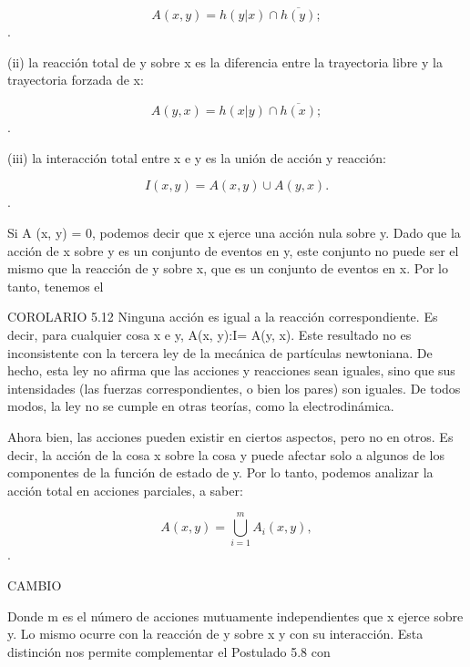 \begin{justifying}
    \begin{center}
        $$ A(x, y) = h(y|x) \cap \overline{h(y)}; $$.
    \end{center}

    (ii) la reacción total de y sobre x es la diferencia entre la trayectoria libre
    y la trayectoria forzada de x:

    \begin{center}
        $$ A(y, x) = h(x|y) \cap \overline{h(x)}; $$.
    \end{center}

    (iii) la interacción total entre x e y es la unión de acción y
    reacción:

    \begin{center}
        $$ I(x, y) = A(x, y) \cup A(y, x). $$.
    \end{center}

    Si A (x, y) = 0, podemos decir que x ejerce una acción nula sobre y.
    Dado que la acción de x sobre y es un conjunto de eventos en y, este conjunto no puede ser el
    mismo que la reacción de y sobre x, que es un conjunto de eventos en x. Por lo tanto, tenemos
    el

    COROLARIO 5.12 Ninguna acción es igual a la reacción correspondiente. Es decir, para
    cualquier cosa x e y, A(x, y):I= A(y, x).
    Este resultado no es inconsistente con la tercera ley de la mecánica de partículas newtoniana.
    De hecho, esta ley no afirma que las acciones y reacciones sean
    iguales, sino que sus intensidades (las fuerzas correspondientes, o bien
    los pares) son iguales. De todos modos, la ley no se cumple en otras teorías, como
    la electrodinámica.

    Ahora bien, las acciones pueden existir en ciertos aspectos, pero no en otros. Es decir,
    la acción de la cosa x sobre la cosa y puede afectar solo a algunos de los
    componentes de la función de estado de y. Por lo tanto, podemos analizar la acción total
    en acciones parciales, a saber: 

    \begin{center}
        $$ A(x, y) = \bigcup_{i=1}^{m} A_{i}(x, y), $$.
    \end{center}

    \pagebreak

    \begin{center}
        CAMBIO
    \end{center}

    Donde m es el número de acciones mutuamente independientes que x ejerce sobre
    y. Lo mismo ocurre con la reacción de y sobre x y con su interacción.
    Esta distinción nos permite complementar el Postulado 5.8 con


\end{justifying}
